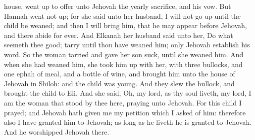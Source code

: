 house, went up to offer unto Jehovah the yearly sacrifice, and his vow. But Hannah went not up; for she said unto her husband, I will not go up until the child be weaned; and then I will bring him, that he may appear before Jehovah, and there abide for ever. And Elkanah her husband said unto her, Do what seemeth thee good; tarry until thou have weaned him; only Jehovah establish his word. So the woman tarried and gave her son suck, until she weaned him. And when she had weaned him, she took him up with her, with three bullocks, and one ephah of meal, and a bottle of wine, and brought him unto the house of Jehovah in Shiloh: and the child was young. And they slew the bullock, and brought the child to Eli. And she said, Oh, my lord, as thy soul liveth, my lord, I am the woman that stood by thee here, praying unto Jehovah. For this child I prayed; and Jehovah hath given me my petition which I asked of him: therefore also I have granted him to Jehovah; as long as he liveth he is granted to Jehovah. And he worshipped Jehovah there. 

